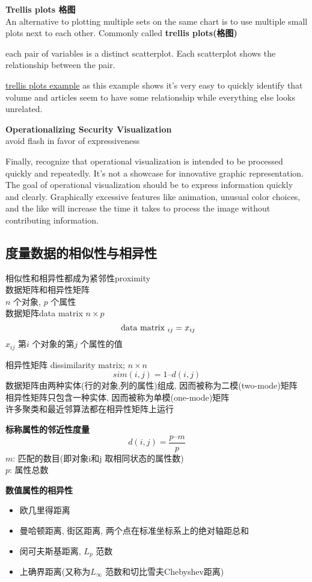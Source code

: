 \documentclass{article}
\begin{document}
\textbf{Trellis plots 格图}\\
An alternative to plotting multiple sets on the same chart is to use multiple small plots
next to each other. Commonly called \textbf{trellis plots(格图)}

each pair of variables is a distinct scatterplot. 
Each scatterplot shows the relationship between the pair. 

\href{http://i.imgbox.com/WvbltL7W.png}{trellis plots example}
as this example shows it's very easy to quickly identify that volume and articles seem to have some relationship while everything else looks unrelated.

\bigskip
\textbf{Operationalizing Security Visualization}\\
avoid flash in favor of expressiveness  

Finally, recognize that operational visualization is intended to be processed quickly and repeatedly. 
It's not a showcase for innovative graphic representation. The goal of operational visualization should be to express information quickly and clearly. 
Graphically excessive features like animation, unusual color choices, 
and the like will increase the time it takes to process the image without contributing information.

\subsection{度量数据的相似性与相异性}
相似性和相异性都成为紧邻性proximity\\
数据矩阵和相异性矩阵\\
$n$ 个对象, $p$ 个属性\\
数据矩阵data matrix $n \times p$\\
$$
\text{ data matrix }_{ij} = x_{ij}
$$
$x_{ij}$ 第$i$ 个对象的第$j$ 个属性的值

相异性矩阵 dissimilarity matrix; $n \times n$
$$
sim(i,j) = 1 – d(i,j)
$$
数据矩阵由两种实体(行的对象,列的属性)组成, 因而被称为二模(two-mode)矩阵\\
相异性矩阵只包含一种实体, 因而被称为单模(one-mode)矩阵\\

许多聚类和最近邻算法都在相异性矩阵上运行

\textbf{标称属性的邻近性度量}
$$
d(i,j) = \frac{p – m}{p}
$$
$m$: 匹配的数目(即对象i和j 取相同状态的属性数)\\
$p$: 属性总数

\textbf{数值属性的相异性}\par
\begin{itemize}
\item 欧几里得距离
\item 曼哈顿距离, 街区距离, 两个点在标准坐标系上的绝对轴距总和
\item 闵可夫斯基距离, $L_p$ 范数
\item 上确界距离(又称为$L_{\infty}$ 范数和切比雪夫Chebyshev距离)
\end{itemize}
\end{document}
